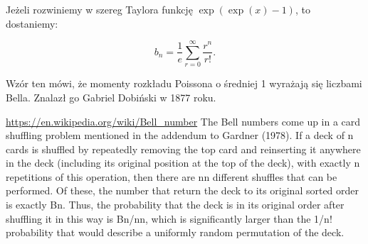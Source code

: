 Jeżeli rozwiniemy w szereg Taylora funkcję $\exp(\exp(x) - 1)$, to dostaniemy:

\begin{corollary}
	\begin{equation}
		b_n = \frac 1e \sum_{r=0}^\infty \frac{r^n}{r!}.
	\end{equation}
\end{corollary}

Wzór ten mówi, że momenty rozkładu Poissona o średniej 1 wyrażają się liczbami Bella.
Znalazł go Gabriel Dobiński \cite{dobinski1877} w 1877 roku.

{
\url{https://en.wikipedia.org/wiki/Bell_number}
\color{red}
The Bell numbers come up in a card shuffling problem mentioned in the addendum to Gardner (1978). If a deck of n cards is shuffled by repeatedly removing the top card and reinserting it anywhere in the deck (including its original position at the top of the deck), with exactly n repetitions of this operation, then there are nn different shuffles that can be performed. Of these, the number that return the deck to its original sorted order is exactly Bn. Thus, the probability that the deck is in its original order after shuffling it in this way is Bn/nn, which is significantly larger than the 1/n! probability that would describe a uniformly random permutation of the deck. 
}





